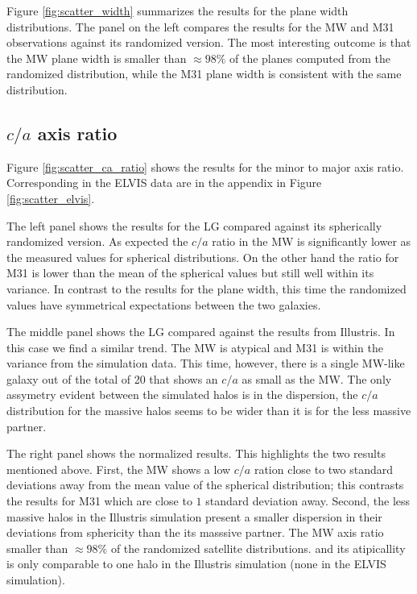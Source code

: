 \documentclass[a4paper,fleqn,usenatbib]{mnras}
\begin{document}
Figure \ref{fig:scatter_width} summarizes the results for the plane
width distributions.
The panel on the left compares the results for the MW and M31
observations against its randomized version. 
The most interesting outcome is that the MW plane width is smaller
than $\approx 98\%$ of the planes computed from the randomized distribution,
while the M31 plane width is consistent with the same distribution. 

\subsection{$c/a$ axis ratio}
Figure \ref{fig:scatter_ca_ratio} shows the results for the minor to
major axis ratio. 
Corresponding in the ELVIS data are in the appendix in Figure
\ref{fig:scatter_elvis}.

The left panel shows the results for the LG compared against its
spherically randomized version.
As expected the $c/a$ ratio in the MW is significantly lower as the
measured values for spherical distributions. 
On the other hand the ratio for M31 is lower than the mean of the
spherical values but still well within its variance.
In contrast to the results for the plane width, this time the
randomized values have symmetrical expectations between the two
galaxies.

The middle panel shows the LG compared against the results from
Illustris. In this case we find a similar trend. The MW is atypical
and M31 is within the variance from the simulation data.
This time, however, there is a single MW-like galaxy out of the total
of 20 that shows an $c/a$ as small as the MW.
The only assymetry evident between the simulated halos is in the
dispersion, the $c/a$ distribution for the massive halos seems to be
wider than it is for the less massive partner. 

The right panel shows the normalized results. 
This highlights the two results mentioned above.
First, the MW shows a low $c/a$ ration close to two standard deviations away
from the mean value of the spherical distribution; this contrasts the
results for M31 which are close to $1$ standard deviation away.
Second, the less massive halos in the Illustris simulation present a
smaller dispersion in their deviations from sphericity than the
its masssive partner.
The MW axis ratio smaller than $\approx 98\%$ of the randomized
satellite distributions.   and its atipicallity is only comparable to
one halo in the Illustris  simulation (none in the ELVIS simulation).
\end{document}

